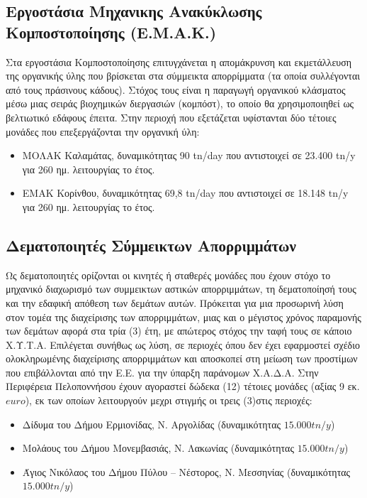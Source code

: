 \documentclass[12pt]{article}
\begin{document}
	\subsection{Εργοστάσια Μηχανικης Ανακύκλωσης Κομποστοποίησης (Ε.Μ.Α.Κ.)}
	
	Στα εργοστάσια Κομποστοποίησης επιτυγχάνεται η απομάκρυνση και  εκμετάλλευση της οργανικής ύλης που βρίσκεται στα σύμμεικτα απορρίμματα (τα οποία συλλέγονται από τους πράσινους κάδους). Στόχος τους είναι η παραγωγή οργανικού κλάσματος μέσω μιας σειράς βιοχημικών διεργασιών  (κομπόστ), το οποίο θα χρησιμοποιηθεί ως βελτιωτικό εδάφους έπειτα. Στην περιοχή που εξετάζεται υφίστανται δύο τέτοιες μονάδες που επεξεργάζονται την οργανική ύλη:
	
	\begin{itemize}
		\item ΜΟΛΑΚ Καλαμάτας, δυναμικότητας 90 tn/day που αντιστοιχεί σε 23.400 tn/y  για 260 ημ. λειτουργίας το έτος.
		\item ΕΜΑΚ Κορίνθου, δυναμικότητας 69,8 tn/day που αντιστοιχεί σε 18.148 tn/y  για 260 ημ. λειτουργίας το έτος.
	\end{itemize}

	\subsection{Δεματοποιητές Σύμμεικτων Απορριμμάτων}
	
	Ως δεματοποιητές ορίζονται οι κινητές ή σταθερές μονάδες που έχουν στόχο το μηχανικό διαχωρισμό των συμμεικτων αστικών απορριμμάτων, τη δεματοποίησή τους και την εδαφική απόθεση των δεμάτων αυτών. Πρόκειται για μια προσωρινή λύση στον τομέα της διαχείρισης των απορριμμάτων, μιας και ο μέγιστος χρόνος παραμονής των δεμάτων αφορά στα τρία (3) έτη, με απώτερος στόχος την ταφή τους σε κάποιο Χ.Υ.Τ.Α. Επιλέγεται συνήθως ως λύση, σε περιοχές όπου δεν έχει εφαρμοστεί σχέδιο ολοκληρωμένης διαχείρισης απορριμμάτων και αποσκοπεί στη μείωση των προστίμων που επιβάλλονται από την Ε.Ε. για την ύπαρξη παράνομων Χ.Α.Δ.Α. Στην Περιφέρεια Πελοποννήσου έχουν αγοραστεί δώδεκα (12) τέτοιες μονάδες (αξίας 9 εκ. $euro$), εκ των οποίων λειτουργούν μεχρι στιγμής οι τρεις (3)στις περιοχές:
	
	\begin{itemize}
		\item Δίδυμα του Δήμου Ερμιονίδας, Ν. Αργολίδας (δυναμικότητας $15.000 tn/y$)
		\item Μολάους του Δήμου Μονεμβασιάς, Ν. Λακωνίας (δυναμικότητας $15.000 tn/y$)
		\item Άγιος Νικόλαος  του Δήμου Πύλου – Νέστορος, Ν. Μεσσηνίας (δυναμικότητας $15.000 tn/y$)
	\end{itemize}
\end{document}
